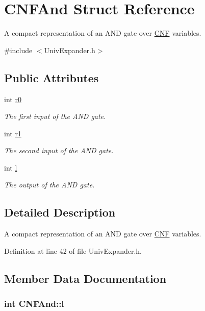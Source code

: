 \hypertarget{structCNFAnd}{\section{C\-N\-F\-And Struct Reference}
\label{structCNFAnd}
}


A compact representation of an A\-N\-D gate over \hyperlink{classCNF}{C\-N\-F} variables.  




{\ttfamily \#include $<$Univ\-Expander.\-h$>$}

\subsection*{Public Attributes}
\begin{DoxyCompactItemize}
\item 
int \hyperlink{structCNFAnd_af6bc1f99380599a333189ee6d0880f35}{r0}
\begin{DoxyCompactList}\small\item\em The first input of the A\-N\-D gate. \end{DoxyCompactList}\item 
int \hyperlink{structCNFAnd_a5d3ba7f5d9083fb928df7bad947a6fc9}{r1}
\begin{DoxyCompactList}\small\item\em The second input of the A\-N\-D gate. \end{DoxyCompactList}\item 
int \hyperlink{structCNFAnd_a25c27a1f92c96ee2f5392c842694c5c1}{l}
\begin{DoxyCompactList}\small\item\em The output of the A\-N\-D gate. \end{DoxyCompactList}\end{DoxyCompactItemize}


\subsection{Detailed Description}
A compact representation of an A\-N\-D gate over \hyperlink{classCNF}{C\-N\-F} variables. 

Definition at line 42 of file Univ\-Expander.\-h.



\subsection{Member Data Documentation}
\hypertarget{structCNFAnd_a25c27a1f92c96ee2f5392c842694c5c1}{
\subsubsection[{l}]{\setlength{\rightskip}{0pt plus 5cm}int C\-N\-F\-And\-::l}}\label{structCNFAnd_a25c27a1f92c96ee2f5392c842694c5c1}



